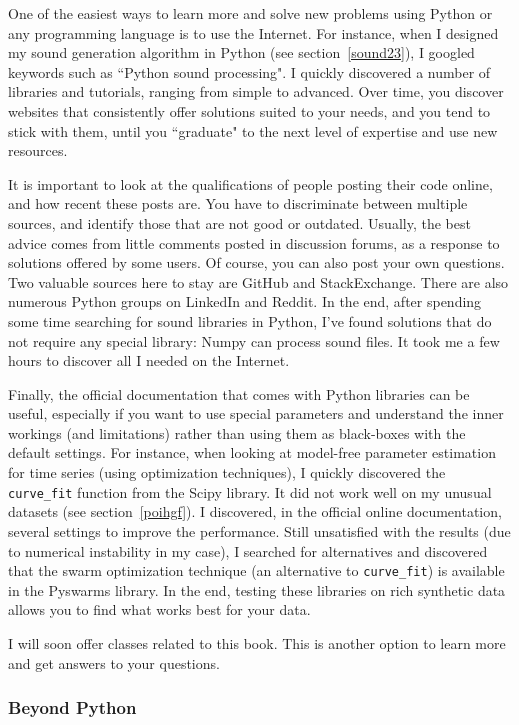 \documentclass[oneside,10pt]{book}
\begin{document}
One of the easiest ways to learn more and solve new problems using Python or any programming language is to use the Internet. For instance, when I designed my 
 sound generation algorithm in Python (see section~\ref{sound23}), I googled keywords such as ``Python sound processing". I quickly discovered a number of libraries and tutorials, ranging from simple to advanced.  Over time, you discover websites that consistently offer solutions suited to your needs, and you tend to stick with them, until you ``graduate" to the next level of expertise and use new resources. 

It is important to look at the qualifications of people posting their code online, and how recent these posts are. You have to discriminate between multiple sources, and identify those that are not good or outdated. Usually, the best advice comes from little comments posted in discussion forums, as a response to solutions offered by some users. Of course, you can also post your own questions. Two valuable sources here to stay are GitHub and StackExchange. There are also numerous Python groups on LinkedIn and Reddit. In the end, after spending some time searching for sound libraries in Python, I've found solutions that do not require any special library: Numpy can process sound files. It took me a few hours to discover all I needed on the Internet. 

Finally, the official documentation that comes with Python libraries can be useful, especially if you want to use special parameters and understand the inner workings (and limitations) rather than using them as black-boxes with the default settings. For instance, when looking at model-free parameter estimation for time series (using optimization techniques), I quickly discovered the 
  \texttt{curve\_fit} function from the Scipy library. It did not work well on my unusual datasets (see section~\ref{poihgf}). I discovered, in the official online documentation, several settings 
 to improve the performance. Still unsatisfied with the results (due to numerical instability in my case), I searched for alternatives and discovered that the swarm optimization technique (an alternative to \texttt{curve\_fit}) is available in the Pyswarms library. In the end, testing these libraries on rich synthetic data allows you to find what works best for your data.  

I will soon offer classes related to this book. This is another option to learn more and get answers to your questions.

\subsubsection{Beyond Python}
\end{document}
